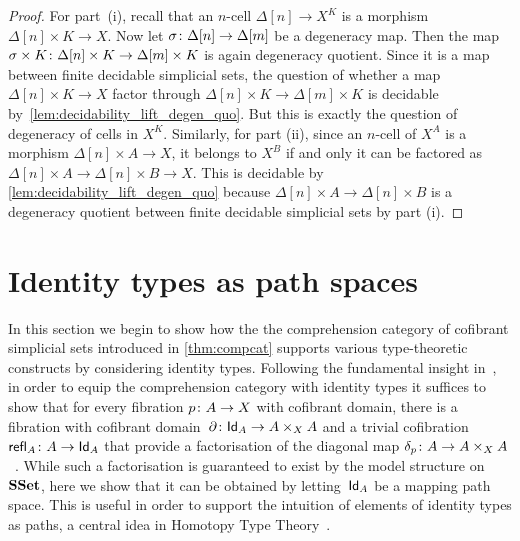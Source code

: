 \documentclass[reqno,10pt,a4paper,oneside,draft]{amsart}
\begin{document}
\begin{proof}  For part~(i), recall that an $n$-cell $\Delta[n] \rightarrow X^K$ is a morphism $\Delta[n] \times K \rightarrow X$. Now let $\sigma \colon \Delta[n] \rightarrow \Delta[m]$ be a degeneracy map. Then the map 
$\sigma \times K \colon \Delta[n] \times K \rightarrow \Delta[m] \times K$ is again degeneracy quotient.
Since it is a map between finite decidable simplicial sets, the question of whether a map $\Delta[n] \times K \rightarrow X$ factor through $\Delta[n] \times K \rightarrow \Delta[m] \times K$ is decidable
by~\cref{lem:decidability_lift_degen_quo}. But this is exactly the question of degeneracy of cells in $X^K$.
Similarly, for part (ii), since an $n$-cell of $X^A$ is a morphism $\Delta[n] \times A \rightarrow X$, it belongs to $X^B$ if and only it can be factored as $\Delta[n] \times A \rightarrow \Delta[n] \times B \rightarrow X$. This is decidable by \cref{lem:decidability_lift_degen_quo} because $\Delta[n] \times A \rightarrow \Delta[n] \times B$ is a degeneracy quotient between finite decidable simplicial sets by part (i).
\end{proof} 








\section{Identity types as path spaces}
\label{sec:pats}


In this section we begin to show how the the comprehension category of cofibrant simplicial
sets introduced in \cref{thm:compcat} supports 
various type-theoretic constructs by considering identity types. Following the fundamental insight in~\cite{awodey-warren:homotopy-idtype}, in order to equip the comprehension category  with identity types it suffices to show that
for every fibration $p \colon A \to X$ with cofibrant domain, there is a  fibration with cofibrant domain~$\partial \colon \mathsf{Id}_A \to A \times_X A$ and a trivial cofibration $\mathsf{refl}_A \colon A \to \mathsf{Id}_A$ that provide a factorisation of the diagonal map $\delta_p \colon A \to A \times_X A$~\cite{LumsdaineP:locuoc}. While such a factorisation is guaranteed to exist by the model structure on $\mathbf{SSet}$, here we show that it can be obtained by letting~$\mathsf{Id}_A$ be a mapping path space. 
This is useful in order to support the intuition of elements of identity types as paths, a central idea in Homotopy Type Theory~\cite{hottbook}. 
\end{document}
